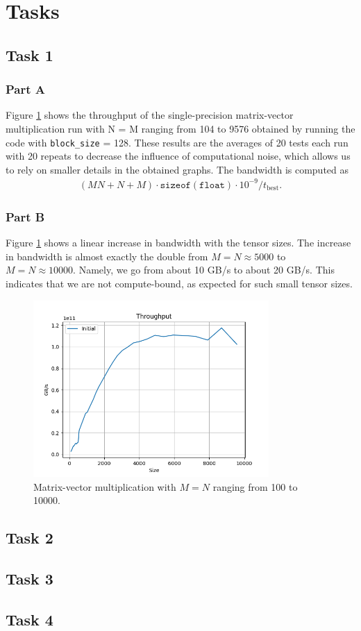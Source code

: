 \documentclass[10pt]{article}
\begin{document}
\section{Tasks}
\subsection{Task 1}
\subsubsection{Part A}
Figure \ref{fig:mv_mult} shows the throughput of the single-precision matrix-vector multiplication run with N = M ranging from 104 to 9576 obtained by running the code with \texttt{block\_size} = 128. These results are the averages of 20 tests each run with 20 repeats to decrease the influence of computational noise, which allows us to rely on smaller details in the obtained graphs. The bandwidth is computed as
\begin{align*}
    (MN + N + M)\cdot\texttt{sizeof}(\texttt{float})\cdot 10^{-9}/t_{\text{best}}.
\end{align*}
\subsubsection{Part B}
Figure \ref{fig:mv_mult} shows a linear increase in bandwidth with the tensor sizes. The increase in bandwidth is almost exactly the double from $M=N\approx5000$ to $M=N\approx10000$. Namely, we go from about 10 GB/s to about 20 GB/s. This indicates that we are not compute-bound, as expected for such small tensor sizes.
\begin{figure}[!ht]
    \centering
    \includegraphics[width=0.8\textwidth]{figs/mv_mult.png}
    \caption{Matrix-vector multiplication with $M=N$ ranging from 100 to 10000.}
    \label{fig:mv_mult}
\end{figure}
\subsection{Task 2}
\subsection{Task 3}
\subsection{Task 4}
\end{document}
